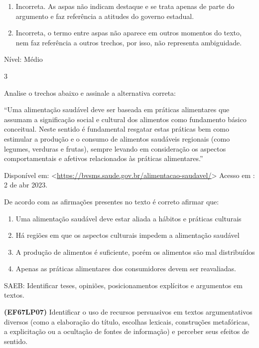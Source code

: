 {\begin{enumerate}
\def\labelenumi{\arabic{enumi}.}
\item
  Incorreta. As aspas não indicam destaque e se trata apenas de parte do
  argumento e faz referência a atitudes do governo estadual.
\item
  Incorreta, o termo entre aspas não aparece em outros momentos do
  texto, nem faz referência a outros trechos, por isso, não representa
  ambiguidade.
\end{enumerate}

Nível: Médio

\num{3}

Analise o trechos abaixo e assinale a alternativa correta:

``Uma alimentação saudável deve ser baseada em práticas alimentares que
assumam a significação social e cultural dos alimentos como fundamento
básico conceitual. Neste sentido é fundamental resgatar estas práticas
bem como estimular a produção e o consumo de alimentos saudáveis
regionais (como legumes, verduras e frutas), sempre levando em
consideração os aspectos comportamentais e afetivos relacionados às
práticas alimentares.''

Disponível em:
\textless{}\href{https://bvsms.saude.gov.br/alimentacao-saudavel/}{\uline{https://bvsms.saude.gov.br/alimentacao-saudavel/}}\textgreater{}
Acesso em : 2 de abr 2023.

De acordo com as afirmações presentes no texto é correto afirmar que:

\begin{enumerate}
\def\labelenumi{\alph{enumi})}
\item
  Uma alimentação saudável deve estar aliada a hábitos e práticas
  culturais
\item
  Há regiões em que os aspectos culturais impedem a alimentação saudável
\item
  A produção de alimentos é suficiente, porém os alimentos são mal
  distribuídos
\item
  Apenas as práticas alimentares dos consumidores devem ser reavaliadas.
\end{enumerate}

SAEB: Identificar teses, opiniões, posicionamentos explícitos e
argumentos em textos.

\textbf{(EF67LP07)} Identificar o uso de recursos persuasivos em textos
argumentativos diversos (como a elaboração do título, escolhas lexicais,
construções metafóricas, a explicitação ou a ocultação de fontes de
informação) e perceber seus efeitos de sentido.

}
